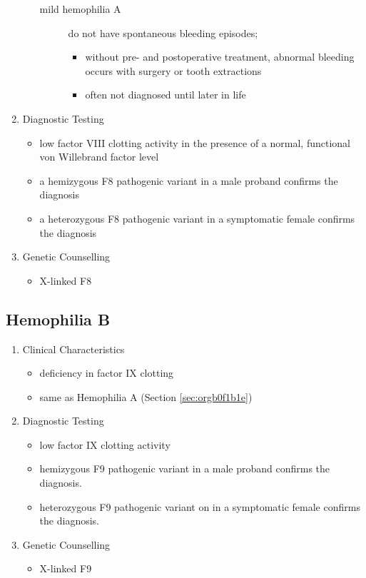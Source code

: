 \documentclass[12pt]{scrartcl}
\begin{document}
\begin{enumerate}
\begin{itemize}
\begin{description}
\item[{mild hemophilia A }] do not have spontaneous bleeding episodes;
\begin{itemize}
\item without pre- and postoperative treatment, abnormal bleeding occurs with surgery
or tooth extractions
\item often not diagnosed until later in life
\end{itemize}
\end{description}
\end{itemize}
\item Diagnostic Testing
\label{sec:org3044060}
\begin{itemize}
\item low factor VIII clotting activity in the presence of a normal,
functional von Willebrand factor level
\item a hemizygous F8 pathogenic variant in a male proband confirms the
diagnosis
\item a heterozygous F8 pathogenic variant in a symptomatic female
confirms the diagnosis
\end{itemize}
\item Genetic Counselling
\label{sec:org6c2bdba}
\begin{itemize}
\item X-linked F8
\end{itemize}
\end{enumerate}

\subsection{Hemophilia B}
\label{sec:orgefbe92f}
\begin{enumerate}
\item Clinical Characteristics
\label{sec:org2b3180e}
\begin{itemize}
\item deficiency in factor IX clotting
\item same as Hemophilia A (Section \ref{sec:orgb0f1b1e})
\end{itemize}
\item Diagnostic Testing
\label{sec:org6ff6977}
\begin{itemize}
\item low factor IX clotting activity
\item hemizygous F9 pathogenic variant in a male proband confirms the
diagnosis.
\item heterozygous F9 pathogenic variant on in a symptomatic female
confirms the diagnosis.
\end{itemize}
\item Genetic Counselling
\label{sec:orge8ba1df}
\begin{itemize}
\item X-linked F9
\end{itemize}
\end{enumerate}
\end{document}
